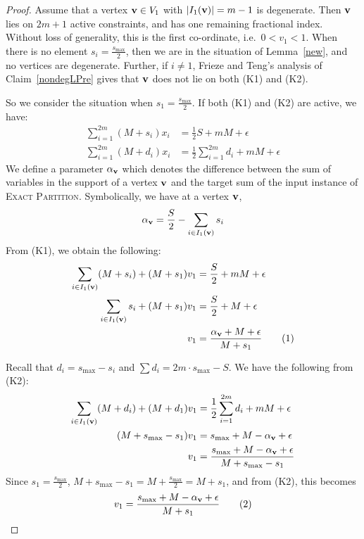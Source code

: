 \documentclass[10pt,a4paper]{amsart}
\def\ve#1{\mathchoice{\mbox{\boldmath$\displaystyle\bf#1$}}
{\mbox{\boldmath$\textstyle\bf#1$}}
{\mbox{\boldmath$\scriptstyle\bf#1$}}
{\mbox{\boldmath$\scriptscriptstyle\bf#1$}}}
\begin{document}
\begin{proof}


Assume that a vertex $\ve{v} \in V_1$ with $|I_1(\ve{v})| = m-1$ is degenerate.  Then $\ve{v}$  %
lies on $2m+1$ active constraints, and has one remaining fractional index.  Without loss of generality, this is the first co-ordinate, i.e.~$0< v_1<1$. 
When there is no element $s_i = \frac{s_{\max}}{2}$, then we are in the situation of Lemma~\ref{new}, and no vertices are degenerate. Further, if $i \ne 1$, Frieze and Teng's analysis of Claim~\ref{nondegLPre} gives that $\ve{v}$ does not lie on both (K1) and (K2).  

So we consider the situation when $s_1 = \frac{s_{\max}}{2}$. 
If both (K1) and (K2) are active, we have: 
\begin{align*}
    \sum_{i=1}^{2m} (M + s_i) x_i &= \frac{1}{2}S + mM + \epsilon \tag{K1}\\ 
\sum_{i=1}^{2m} (M + d_i)x_i &= \frac{1}{2} \sum_{i=1}^{2m} d_i + mM + \epsilon \tag{K2}
\end{align*}
We define a parameter $\alpha_{\ve{v}}$ which denotes the difference between the sum of variables in the support of a vertex $\ve{v}$ and the target sum of the input instance of \textsc{Exact Partition}. Symbolically, we have at a vertex $\ve{v}$, $$\displaystyle \alpha_{\ve{v}} = \frac{S}{2} - \sum_{i \in I_1(\ve{v})}s_i$$
From (K1), we obtain the following:
        \begin{align*}
            \sum_{i \in I_1(\ve{v})}(M+s_i) + (M+s_1)v_1 &= \frac{S}{2} + mM + \epsilon \\
            \sum_{i \in I_1(\ve{v})}s_i + (M+s_1)v_1 &= \frac{S}{2} + M + \epsilon \\
            v_1 &= \frac{\alpha_{\ve{v}} + M + \epsilon}{M+s_1} \text{\tag{1}}
        \end{align*}

Recall that $d_i = s_{\max}-s_i$ and $\sum d_i = 2m \cdot s_{\max} - S$. We have the following from (K2):
        \begin{align*}
           \sum_{i \in I_1(\ve{v})}(M+d_i) + (M+d_1)v_1 &= \frac{1}{2}\sum_{i=1}^{2m} d_i + mM + \epsilon \\
           (M+s_{\max}-s_1)v_1 &= s_{\max} + M - \alpha_{\ve{v}} + \epsilon\\
           v_1 &= \frac{s_{\max} + M - \alpha_{\ve{v}} + \epsilon}{M + s_{\max} -s_1}
        \end{align*}
Since $s_1 = \frac{s_{\max}}{2}$, $M+s_{\max}-s_1 = M + \frac{s_{\max}}{2} = M+s_1$, and from (K2), this becomes
\begin{align*}
    v_1 = \frac{s_{\max} + M - \alpha_{\ve{v}} + \epsilon}{M + s_1}\tag{2}
\end{align*}


\end{proof}
\end{document}
